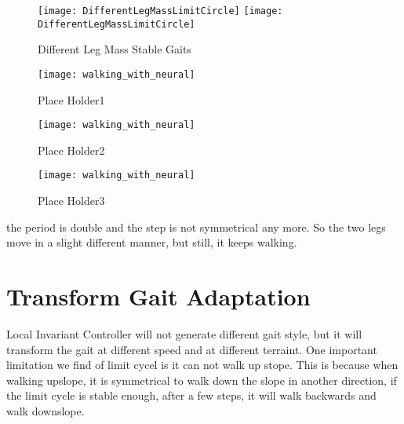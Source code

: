 \begin{figure}[!htbp]
  \begin{center}
    \leavevmode
    \ifpdf
      \texttt{[image: DifferentLegMassLimitCircle]}
    \else
      \texttt{[image: DifferentLegMassLimitCircle]}
    \fi
    \caption{Different Leg Mass Stable Gaits}
    \label{fig:differentlr}
\end{center}
\end{figure}


\begin{figure}[!htbp]
  \begin{center}
      \texttt{[image: walking\_with\_neural]}
    \caption{Place Holder1}
    \label{fig:lm1}
\end{center}
\end{figure}

\begin{figure}[!htbp]
  \begin{center}
      \texttt{[image: walking\_with\_neural]}
    \caption{Place Holder2}
    \label{fig:lm2}
\end{center}
\end{figure}

\begin{figure}[!htbp]
  \begin{center}
      \texttt{[image: walking\_with\_neural]}
    \caption{Place Holder3}
    \label{fig:lm3}
\end{center}
\end{figure}





the period is double and the step is not symmetrical any more. So the two legs move in a slight different manner, but still, it keeps walking.

\section{Transform Gait Adaptation}
Local Invariant Controller will not generate different gait style, but it will transform the gait at different speed and at different terraint.
One important limitation we find of limit cycel is it can not walk up stope.
This is because when walking upslope, it is symmetrical to walk down the slope in another direction, if the limit cycle is stable enough, after a few steps, it will walk backwards and walk downslope.


